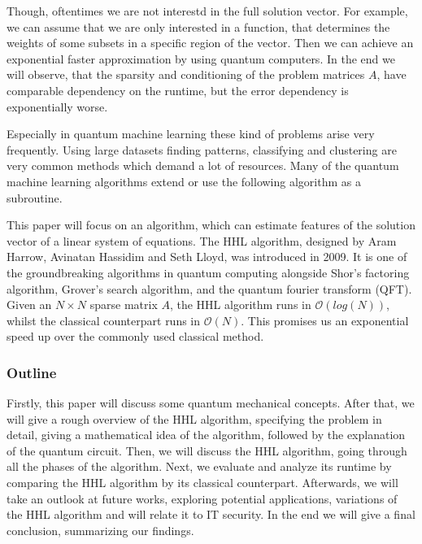 Though, oftentimes we are not interestd in the full solution vector. 
For example, we can assume that we are only interested in a function, that determines the weights of some subsets in a specific region of the vector.
Then we can achieve an exponential faster approximation by using quantum computers. 
In the end we will observe, that the sparsity and conditioning of the problem matrices $A$, have comparable dependency on the runtime, but the error dependency is exponentially worse. 

Especially in quantum machine learning these kind of problems arise very frequently. 
Using large datasets finding patterns, classifying and clustering are very common methods which demand a lot of resources. 
Many of the quantum machine learning algorithms extend or use the following algorithm as a subroutine. 

This paper will focus on an algorithm, which can estimate features of the solution vector of a linear system of equations.
The HHL algorithm, designed by Aram Harrow, Avinatan Hassidim and Seth Lloyd, was introduced in 2009. 
It is one of the groundbreaking algorithms in quantum computing alongside Shor's factoring algorithm, Grover's search algorithm, and the quantum fourier transform (QFT).
Given an $N \times N$ sparse matrix $A$, the HHL algorithm runs in $\mathcal{O} (log (N))$, whilst the classical counterpart runs in $\mathcal{O} (N)$.
This promises us an exponential speed up over the commonly used classical method.

\subsubsection{Outline}
Firstly, this paper will discuss some quantum mechanical concepts.
After that, we will give a rough overview of the HHL algorithm, specifying the problem in detail, giving a mathematical idea of the algorithm, followed by the explanation of the quantum circuit.
Then, we will discuss the HHL algorithm, going through all the phases of the algorithm.
Next, we evaluate and analyze its runtime by comparing the HHL algorithm by its classical counterpart. 
Afterwards, we will take an outlook at future works, exploring potential applications, variations of the HHL algorithm and will relate it to IT security. 
In the end we will give a final conclusion, summarizing our findings. 





